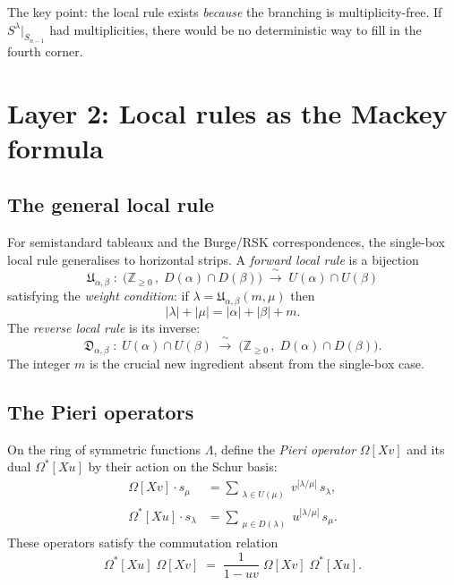 \documentclass[12pt,a4paper]{article}
\theoremstyle{definition}
\theoremstyle{remark}
\newcommand{\Z}{\mathbb{Z}}
\newcommand{\fU}{\mathfrak{U}}
\newcommand{\fD}{\mathfrak{D}}
\begin{document}
The key point: the local rule exists \emph{because} the branching is
multiplicity-free. If $S^\lambda|_{S_{n-1}}$ had multiplicities, there
would be no deterministic way to fill in the fourth corner.

\section{Layer 2: Local rules as the Mackey formula}
\label{sec:mackey}

\subsection{The general local rule}

For semistandard tableaux and the Burge/RSK correspondences, the
single-box local rule generalises to horizontal strips. A
\emph{forward local rule} is a bijection
\begin{equation}\label{eq:forward}
  \fU_{\alpha,\beta}
  \;:\; \bigl(\Z_{\geqslant 0}\,,\; D(\alpha) \cap D(\beta)\bigr)
  \;\xrightarrow{\;\sim\;}\;
  U(\alpha) \cap U(\beta)
\end{equation}
satisfying the \emph{weight condition}: if
$\lambda = \fU_{\alpha,\beta}(m, \mu)$ then
\begin{equation}\label{eq:weight}
  |\lambda| + |\mu| = |\alpha| + |\beta| + m.
\end{equation}
The \emph{reverse local rule} is its inverse:
\begin{equation}\label{eq:reverse}
  \fD_{\alpha,\beta}
  \;:\; U(\alpha) \cap U(\beta)
  \;\xrightarrow{\;\sim\;}\;
  \bigl(\Z_{\geqslant 0}\,,\; D(\alpha) \cap D(\beta)\bigr).
\end{equation}
The integer $m$ is the crucial new ingredient absent from the
single-box case.

\subsection{The Pieri operators}

On the ring of symmetric functions $\Lambda$, define the
\emph{Pieri operator} $\Omega[Xv]$ and its dual $\Omega^*[Xu]$ by
their action on the Schur basis:
\begin{align}
  \Omega[Xv] \cdot s_\mu
  &= \sum_{\substack{\lambda \in U(\mu)}} v^{|\lambda/\mu|}\, s_\lambda,
  \label{eq:pieri-op} \\
  \Omega^*[Xu] \cdot s_\lambda
  &= \sum_{\substack{\mu \in D(\lambda)}} u^{|\lambda/\mu|}\, s_\mu.
  \label{eq:dual-pieri-op}
\end{align}
These operators satisfy the commutation relation
\begin{equation}\label{eq:pieri-comm}
  \Omega^*[Xu]\;\Omega[Xv]
  \;=\; \frac{1}{1 - uv}\;\Omega[Xv]\;\Omega^*[Xu].
\end{equation}
\end{document}
